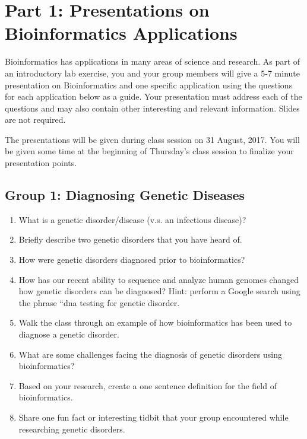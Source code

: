 



\section*{Part 1: Presentations on Bioinformatics Applications}

Bioinformatics has applications in many areas of science and research.  As part of an introductory lab exercise, you and your group members will give a 5-7 minute presentation on Bioinformatics and one specific application using the questions for each application below as a guide.  Your presentation must address each of the questions and may also contain other interesting and relevant information.  Slides are not required.

\noindent  The presentations will be given during class session on 31 August, 2017. You will be given some time at the beginning of  Thursday's class session to finalize your presentation points.

\subsection*{Group 1: Diagnosing Genetic Diseases}
\begin{enumerate}
	\item What is a genetic disorder/disease (v.s. an infectious disease)?
	\item Briefly describe two genetic disorders that you have heard of.
	\item How were genetic disorders diagnosed prior to bioinformatics?
	\item How has our recent ability to sequence and analyze human genomes changed how genetic disorders can be diagnosed?  Hint: perform a Google search using the phrase ``dna testing for genetic disorder.
	\item Walk the class through an example of how bioinformatics has been used to diagnose a genetic disorder.
	\item What are some challenges facing the diagnosis of genetic disorders using bioinformatics?
	\item Based on your research, create a one sentence definition for the field of bioinformatics.
	\item Share one fun fact or interesting tidbit that your group encountered while researching genetic disorders.
\end{enumerate}

